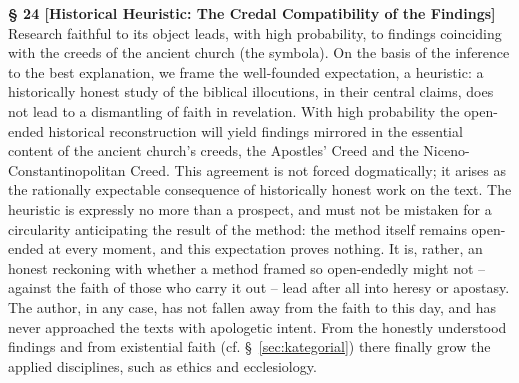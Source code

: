 \documentclass[11pt,a4paper]{article}
\makeatletter
\newcommand{\apthsec}[3]{%
  \phantomsection%
  \def\@currentlabel{#1}%
  \label{sec:#3}%
  \textbf{§ #1 [#2]}%
}
\makeatother
\begin{document}
\apthsec{24}{Historical Heuristic: The Credal Compatibility of the Findings}{heuristik-befund} Research faithful to its object leads, with high probability, to findings coinciding with the creeds of the ancient church (the symbola). On the basis of the inference to the best explanation, we frame the well-founded expectation, a heuristic: a historically honest study of the biblical illocutions, in their central claims, does not lead to a dismantling of faith in revelation. With high probability the open-ended historical reconstruction will yield findings mirrored in the essential content of the ancient church's creeds, the Apostles' Creed and the Niceno-Constantinopolitan Creed. This agreement is not forced dogmatically; it arises as the rationally expectable consequence of historically honest work on the text. The heuristic is expressly no more than a prospect, and must not be mistaken for a circularity anticipating the result of the method: the method itself remains open-ended at every moment, and this expectation proves nothing. It is, rather, an honest reckoning with whether a method framed so open-endedly might not -- against the faith of those who carry it out -- lead after all into heresy or apostasy. The author, in any case, has not fallen away from the faith to this day, and has never approached the texts with apologetic intent. From the honestly understood findings and from existential faith (cf. §~\ref{sec:kategorial}) there finally grow the applied disciplines, such as ethics and ecclesiology.
\end{document}
